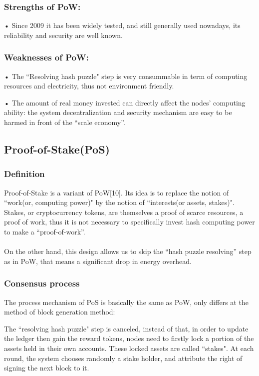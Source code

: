 \documentclass[doublespacing]{bmcart}
\begin{document}
\begin{CJK*}{UTF8}{gbsn}
    \subsubsection*{Strengths of PoW:}
   • Since 2009 it has been widely tested, and still generally used nowadays, its reliability and security are well known.
	\subsubsection*{Weaknesses of PoW:}
    • The ``Resolving hash puzzle" step is very consummable in term of computing resources and electricity, thus not environment friendly.
\par • The amount of real money invested can directly affect the nodes’ computing ability: the system decentralization and security mechanism are easy to be harmed in front of the “scale economy”. 

	\subsection{Proof-of-Stake(PoS)} 
	\subsubsection*{Definition}
	Proof-of-Stake is a variant of PoW[10]. Its idea is to replace the notion of ``work(or, computing power)" by the notion of ``interests(or assets, stakes)". Stakes, or cryptocurrency tokens, are themselves a proof of scarce resources, a proof of work, thus it is not necessary to specifically invest hash computing power to make a ``proof-of-work''. 
	\paragraph{}
	On the other hand, this design allows us to skip the ``hash puzzle resolving'' step as in PoW, that means a significant drop in energy overhead.
	\subsubsection*{Consensus process}
	The process mechanism of PoS is basically the same as PoW, only differs at the method of block generation method: 
	\par The ``resolving hash puzzle" step is canceled, instead of that, in order to update the ledger then gain the reward tokens, nodes need to firstly lock a portion of the assets held in their own accounts. These locked assets are called ``stakes". At each round, the system chooses randomly a stake holder, and attribute the right of signing the next block to it. 

\end{CJK*}
\end{document}
